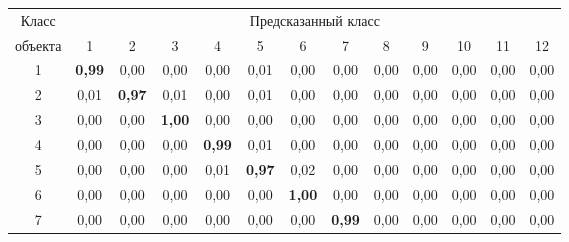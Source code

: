 \begin{table}\small %


\begin{center}


\parbox{396pt}{


\label{tbl:USCHAD_AR_FOURIER_confusion}


}





\vspace*{2ex}





\begin{tabular}{|c|c|c|c|c|c|c|c|c|c|c|c|c|}


  \hline


Класс & \multicolumn{12}{c|}{Предсказанный класс} \\ 


\cline{2-13}


объекта & 1 & 2 & 3 & 4 & 5 & 6 & 7 & 8 & 9 & 10 & 11 & 12\\ 


\hline


 1& \textbf{0{,}99} & 0,00 & 0,00 & 0,00 & 0,01 & 0,00 & 0,00 & 0,00 & 0,00 & 0,00 & 0,00 & 0,00\\ 


 2& 0,01 & \textbf{0{,}97} & 0,01 & 0,00 & 0,01 & 0,00 & 0,00 & 0,00 & 0,00 & 0,00 & 0,00 & 0,00\\ 


 3& 0,00 & 0,00 & \textbf{1{,}00} & 0,00 & 0,00 & 0,00 & 0,00 & 0,00 & 0,00 & 0,00 & 0,00 & 0,00\\ 


 4& 0,00 & 0,00 & 0,00 & \textbf{0{,}99} & 0,01 & 0,00 & 0,00 & 0,00 & 0,00 & 0,00 & 0,00 & 0,00\\ 


 5& 0,00 & 0,00 & 0,00 & 0,01 & \textbf{0{,}97} & 0,02 & 0,00 & 0,00 & 0,00 & 0,00 & 0,00 & 0,00\\ 


 6& 0,00 & 0,00 & 0,00 & 0,00 & 0,00 & \textbf{1{,}00} & 0,00 & 0,00 & 0,00 & 0,00 & 0,00 & 0,00\\ 


 7& 0,00 & 0,00 & 0,00 & 0,00 & 0,00 & 0,00 & \textbf{0{,}99} & 0,00 & 0,00 & 0,00 & 0,00 & 0,00\\ 



\end{tabular}
\end{center}
\end{table}
